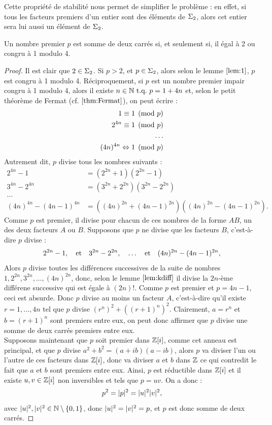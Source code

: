 Cette propriété de stabilité nous permet de simplifier le problème : en effet, si tous les facteurs premiers d'un entier sont des éléments
de $\Sigma_2$, alors cet entier sera lui aussi un élément de $\Sigma_2$. 

\begin{thm}
Un nombre premier $p$ est somme de deux carrés si, et seulement si, il égal à 2 ou congru à 1 modulo 4.
\end{thm}

\begin{proof}
Il est clair que $2 \in \Sigma_2$. Si $p>2$, et $p \in \Sigma_2$, alors selon le lemme $\ref{lem:1}$, $p$ est congru à 1 modulo 4. 
Réciproquement, si $p$ est un nombre premier impair congru à 1 modulo 4, alors il existe $n \in \mathbb{N} \text{~t.q.~} p=1+4n$
et, selon le petit théorème de Fermat (cf. $\ref{thm:Fermat}$), on peut écrire :
\begin{align*}
1 \equiv 1 \pmod p \\
2^{4n} \equiv 1 \pmod p \\
\dots \\
(4n)^{4n} \Leftrightarrow 1 \pmod p
\end{align*} 
Autrement dit, $p$ divise tous les nombres suivants :
\begin{align*}
2^{4n}-1 & = (2^{2n} + 1)(2^{2n}-1) \\
3^{4n}-2^{4n} & = (3^{2n} + 2^{2n})(3^{2n}-2^{2n}) \\
\dots \\
(4n)^{4n}-(4n-1)^{4n} & = ((4n)^{2n} + (4n-1)^{2n})((4n)^{2n}-(4n-1)^{2n}) .
\end{align*}
Comme $p$ est premier, il divise pour chacun de ces nombres de la forme $AB$, un des deux facteurs $A$ ou $B$.
Supposons que $p$ ne divise que les facteurs $B$, c'est-à-dire $p$ divise :
\[ 2^{2n}-1, \quad \text{et} \quad 3^{2n}-2^{2n}, \quad \dots \quad \text{et} \quad (4n)^{2n}-(4n-1)^{2n} , \]
Alors $p$ divise toutes les différences successives de la suite de nombres $1, 2^{2n}, 3^{2n}, \dots, (4n)^{2n}$,
donc, selon le lemme $\ref{lem:kdiff}$ il divise la $2n$-ème différene successive qui est égale à $(2n)!$. 
Comme $p$ est premier et $p=4n-1$, ceci est absurde.
Donc $p$ divise au moins un facteur $A$, c'est-à-dire qu'il existe $r = 1, \dots, 4n$ tel que $p$ divise $(r^n)^2 + ((r+1)^n)^2$.
Clairement, $a=r^n$ et $b=(r+1)^n$ sont premiers entre eux, 
on peut donc affirmer que $p$ divise une somme de deux carrés premiers entre eux. \\

Supposons maintenant que $p$ soit premier dans $\mathbb{Z}[i]$, comme cet anneau est principal, et que $p$ divise 
$a^2 + b^2 = (a+ib)(a-ib)$, alors $p$ va diviser l'un ou l'autre de ces facteurs dans $\mathbb{Z}[i]$, donc va diviser $a$ et $b$ dans $\mathbb{Z}$
ce qui contredit le fait que $a$ et $b$ sont premiers entre eux.
Ainsi, $p$ est réductible dans $\mathbb{Z}[i]$ et il existe $u, v \in \mathbb{Z}[i]$ non inversibles et tels que $p=uv$. On a donc :
\[ p^2 = \lvert p\rvert^2 = \lvert u\rvert^2 \lvert v\rvert^2, \]
avec $\lvert u\rvert^2, \lvert v\rvert^2 \in \mathbb{N} \setminus \{ 0,1 \}$, donc $\lvert u\rvert^2=\lvert v\rvert^2=p$, et $p$ est donc somme de deux carrés.
\end{proof}

